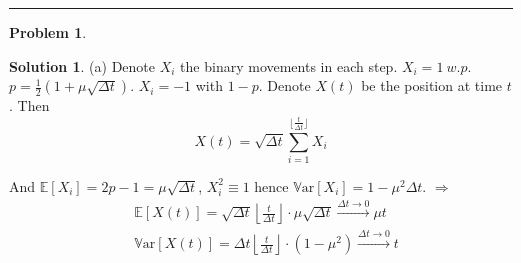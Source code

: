 \documentclass[a4paper, 10pt]{article}
\theoremstyle{definition}
\newtheorem{problem}{Problem}
\theoremstyle{hSol}
\newtheorem*{solution}{Solution}
\begin{document}
\noindent\rule{16cm}{0.4pt}
\begin{problem} 
\end{problem}
\begin{solution} (a) Denote $X_i$ the binary movements in each step. $X_i=1~w.p.$ $p=\frac{1}{2}(1+\mu\sqrt{\Delta t})$. $X_i=-1$ with $1-p$. Denote $X(t)$ be the position at time $t$. Then
\begin{equation}
  X(t) = \sqrt{\Delta t} \sum_{i=1}^{\lfloor \frac{t}{\Delta t} \rfloor} X_i
\end{equation}
\end{solution}
And $\mathbb{E}\left[X_i\right]=2p-1 = \mu \sqrt{\Delta t}$, $X_i^2\equiv 1$ hence $\mathrm{\mathbb{V}ar}\left[X_i\right]=1-\mu^2 \Delta t$. $\Rightarrow$
\begin{equation}
  \begin{split}
    & \mathbb{E}\left[X(t)\right] = \sqrt{\Delta t} \left\lfloor \frac{t}{\Delta t} \right\rfloor \cdot \mu\sqrt{\Delta t} \xrightarrow{\Delta t \to 0} \mu t \\
    & \mathrm{\mathbb{V}ar}\left[X(t)\right] = \Delta t \left\lfloor \frac{t}{\Delta t} \right\rfloor \cdot (1-\mu^2) \xrightarrow{\Delta t \to 0}  t
  \end{split}
\end{equation}
\end{document}
